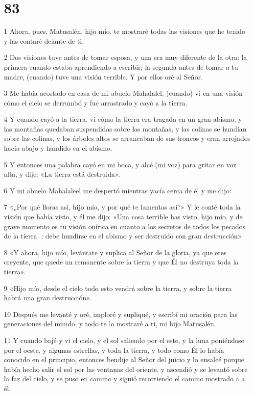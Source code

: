 
\chapter{83}

\par 1 Ahora, pues, Matusalén, hijo mío, te mostraré todas las visiones que he tenido y las contaré delante de ti.
\par 2 Dos visiones tuve antes de tomar esposa, y una era muy diferente de la otra: la primera cuando estaba aprendiendo a escribir; la segunda antes de tomar a tu madre, (cuando) tuve una visión terrible. Y por ellos oré al Señor.
\par 3 Me había acostado en casa de mi abuelo Mahalalel, (cuando) vi en una visión cómo el cielo se derrumbó y fue arrastrado y cayó a la tierra.
\par 4 Y cuando cayó a la tierra, vi cómo la tierra era tragada en un gran abismo, y las montañas quedaban suspendidas sobre las montañas, y las colinas se hundían sobre las colinas, y los árboles altos se arrancaban de sus troncos y eran arrojados hacia abajo y hundido en el abismo.
\par 5 Y entonces una palabra cayó en mi boca, y alcé (mi voz) para gritar en voz alta, y dije: «La tierra está destruida».
\par 6 Y mi abuelo Mahalaleel me despertó mientras yacía cerca de él y me dijo:
\par 7 «¿Por qué lloras así, hijo mío, y por qué te lamentas así?» Y le conté toda la visión que había visto, y él me dijo: «Una cosa terrible has visto, hijo mío, y de grave momento es tu visión onírica en cuanto a los secretos de todos los pecados de la tierra. : debe hundirse en el abismo y ser destruido con gran destrucción».
\par 8 «Y ahora, hijo mío, levántate y suplica al Señor de la gloria, ya que eres creyente, que quede un remanente sobre la tierra y que Él no destruya toda la tierra».
\par 9 «Hijo mío, desde el cielo todo esto vendrá sobre la tierra, y sobre la tierra habrá una gran destrucción».
\par 10 Después me levanté y oré, imploré y supliqué, y escribí mi oración para las generaciones del mundo, y todo te lo mostraré a ti, mi hijo Matusalén.
\par 11 Y cuando bajé y vi el cielo, y el sol saliendo por el este, y la luna poniéndose por el oeste, y algunas estrellas, y toda la tierra, y todo como Él lo había conocido en el principio, entonces bendije al Señor del juicio y lo ensalcé porque había hecho salir el sol por las ventanas del oriente, y ascendió y se levantó sobre la faz del cielo, y se puso en camino y siguió recorriendo el camino mostrado a a él.

